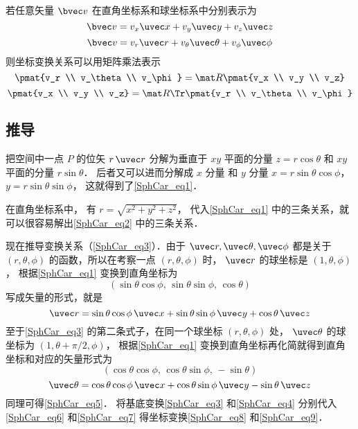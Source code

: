 若任意矢量 $\bvec v$ 在直角坐标系和球坐标系中分别表示为
\begin{equation}\label{SphCar_eq7}
\bvec v = v_x \uvec x + v_y \uvec y + v_z \uvec z
\end{equation}
\begin{equation}\label{SphCar_eq6}
\bvec v = v_r \uvec r + v_\theta \uvec \theta + v_\phi \uvec \phi
\end{equation}
则坐标变换关系可以用矩阵乘法表示
\begin{equation}\label{SphCar_eq9}
\pmat{v_r \\ v_\theta \\ v_\phi}
= \mat R \pmat{v_x \\ v_y \\ v_z}
\end{equation}
\begin{equation}\label{SphCar_eq8}
\pmat{v_x \\ v_y \\ v_z}
= \mat R\Tr \pmat{v_r \\ v_\theta \\ v_\phi}
\end{equation}

\subsection{推导}
把空间中一点 $P$ 的位矢 $r \,\uvec r$ 分解为垂直于 $xy$ 平面的分量 $z = r\cos \theta $ 和 $xy$ 平面的分量 $r\sin \theta $． 后者又可以进而分解成 $x$ 分量 和 $y$ 分量  $x = r\sin \theta \cos \phi$，  $y = r\sin \theta \sin \phi$， 这就得到了\autoref{SphCar_eq1}．

在直角坐标系中， 有 $r = \sqrt {x^2 + y^2 + z^2}$， 代入\autoref{SphCar_eq1} 中的三条关系，就可以很容易解出\autoref{SphCar_eq2} 中的三条关系．

现在推导变换关系（\autoref{SphCar_eq3}）．由于 $\uvec r,\uvec \theta ,\uvec \phi $ 都是关于 $(r, \theta, \phi)$ 的函数，所以在考察一点 $(r, \theta, \phi)$ 时， $\uvec r$ 的球坐标是 $(1, \theta, \phi)$，  根据\autoref{SphCar_eq1} 变换到直角坐标为
\begin{equation}
(\sin \theta \cos \phi,\,\sin \theta \sin \phi,\,\cos \theta)
\end{equation}
写成矢量的形式，就是
 \begin{equation}
\uvec r = \sin \theta \cos \phi \,\uvec x + \sin \theta \sin \phi \,\uvec y + \cos \theta \,\uvec z
\end{equation}
至于\autoref{SphCar_eq3} 的第二条式子，在同一个球坐标 $(r,\theta ,\phi)$ 处， $\uvec \theta $ 的球坐标为 $(1, \theta + \pi /2, \phi)$， 根据\autoref{SphCar_eq1} 变换到直角坐标再化简就得到直角坐标和对应的矢量形式为
\begin{equation}
(\cos \theta \cos \phi ,\,\cos \theta \sin \phi , \,- \sin \theta)
\end{equation}
\begin{equation}
\uvec \theta  = \cos \theta \cos \phi \,\uvec x + \cos \theta \sin \phi \,\uvec y - \sin \theta \,\uvec z
\end{equation}
同理可得\autoref{SphCar_eq5}． 将基底变换\autoref{SphCar_eq3} 和\autoref{SphCar_eq4} 分别代入\autoref{SphCar_eq6} 和\autoref{SphCar_eq7} 得坐标变换\autoref{SphCar_eq8} 和\autoref{SphCar_eq9}．
